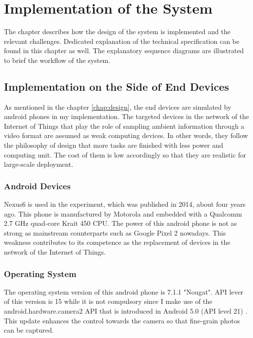 \chapter{Implementation of the System} \label{chap:implementation}

The chapter describes how the design of the system is implemented and the relevant challenges. Dedicated explanation of the technical specification can be found in this chapter as well. The explanatory sequence diagrams are illustrated to brief the workflow of the system.

\section{Implementation on the Side of End Devices}

As mentioned in the chapter \ref{chap:design}, the end devices are simulated by android phones in my implementation. The targeted devices in the network of the Internet of Things that play the role of sampling ambient information through a video format are assumed as weak computing devices. In other words, they follow the philosophy of design that more tasks are finished with less power and computing unit. The cost of them is low accordingly so that they are realistic for large-scale deployment.

\subsection{Android Devices}
Nexus6 is used in the experiment, which was published in 2014, about four years ago. This phone is manufactured by Motorola and embedded with a Qualcomm 2.7 GHz quad-core Krait 450 CPU. \cite{wiki:nexus6} The power of this android phone is not as strong as mainstream counterparts such as Google Pixel 2 nowadays. This weakness contributes to its competence as the replacement of devices in the network of the Internet of Things.

\subsection{Operating System}
The operating system version of this android phone is 7.1.1 "Nougat". API \cite{android-api} lever of this version is 15 while it is not compulsory since I make use of the android.hardware.camera2 API that is introduced in Android 5.0 (API level 21) \cite{android5.0}. This update enhances the control towards the camera so that fine-grain photos can be captured. 

